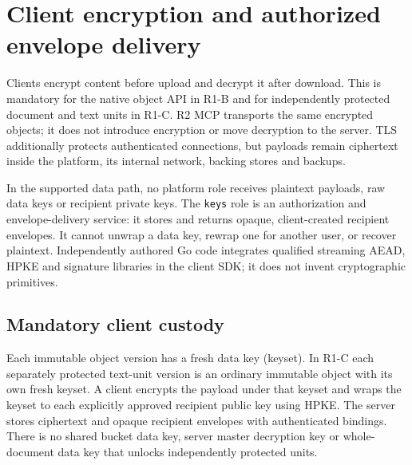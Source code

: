 \documentclass[11pt,a4paper]{article}
\newcommand{\code}[1]{{\small\nolinkurl{#1}}}
\begin{document}

\section{Client encryption and authorized envelope delivery}\label{sec:custody}
Clients encrypt content before upload and decrypt it after download. This is mandatory for the native object API in R1-B and for independently protected document and text units in R1-C. R2 MCP transports the same encrypted objects; it does not introduce encryption or move decryption to the server. TLS additionally protects authenticated connections, but payloads remain ciphertext inside the platform, its internal network, backing stores and backups.

In the supported data path, no platform role receives plaintext payloads, raw data keys or recipient private keys. The \code{keys} role is an authorization and envelope-delivery service: it stores and returns opaque, client-created recipient envelopes. It cannot unwrap a data key, rewrap one for another user, or recover plaintext. Independently authored Go code integrates qualified streaming AEAD, HPKE and signature libraries in the client SDK; it does not invent cryptographic primitives.

\subsection{Mandatory client custody}
Each immutable object version has a fresh data key (keyset). In R1-C each separately protected text-unit version is an ordinary immutable object with its own fresh keyset. A client encrypts the payload under that keyset and wraps the keyset to each explicitly approved recipient public key using HPKE. The server stores ciphertext and opaque recipient envelopes with authenticated bindings. There is no shared bucket data key, server master decryption key or whole-document data key that unlocks independently protected units.
\end{document}
